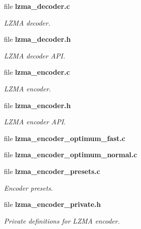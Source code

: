 \begin{DoxyCompactItemize}
file {\bf lzma\-\_\-decoder.\-c}
\begin{DoxyCompactList}\small\item\em L\-Z\-M\-A decoder. \end{DoxyCompactList}\item 
file {\bf lzma\-\_\-decoder.\-h}
\begin{DoxyCompactList}\small\item\em L\-Z\-M\-A decoder A\-P\-I. \end{DoxyCompactList}\item 
file {\bf lzma\-\_\-encoder.\-c}
\begin{DoxyCompactList}\small\item\em L\-Z\-M\-A encoder. \end{DoxyCompactList}\item 
file {\bf lzma\-\_\-encoder.\-h}
\begin{DoxyCompactList}\small\item\em L\-Z\-M\-A encoder A\-P\-I. \end{DoxyCompactList}\item 
file {\bf lzma\-\_\-encoder\-\_\-optimum\-\_\-fast.\-c}
\item 
file {\bf lzma\-\_\-encoder\-\_\-optimum\-\_\-normal.\-c}
\item 
file {\bf lzma\-\_\-encoder\-\_\-presets.\-c}
\begin{DoxyCompactList}\small\item\em Encoder presets. \end{DoxyCompactList}\item 
file {\bf lzma\-\_\-encoder\-\_\-private.\-h}
\begin{DoxyCompactList}\small\item\em Private definitions for L\-Z\-M\-A encoder. \end{DoxyCompactList}\end{DoxyCompactItemize}
